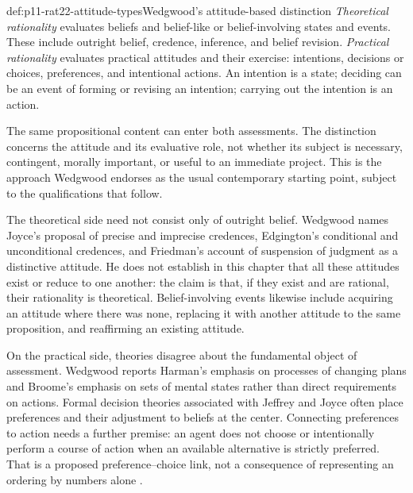 \begin{hbdefinition}{def:p11-rat22-attitude-types}{Wedgwood's attitude-based distinction}
\emph{Theoretical rationality} evaluates beliefs and belief-like or
belief-involving states and events. These include outright belief,
credence, inference, and belief revision.
\emph{Practical rationality} evaluates practical attitudes and their
exercise: intentions, decisions or choices, preferences, and intentional
actions. An intention is a state; deciding can be an event of forming or
revising an intention; carrying out the intention is an action.

The same propositional content can enter both assessments. The distinction
concerns the attitude and its evaluative role, not whether its subject is
necessary, contingent, morally important, or useful to an immediate project.
This is the approach Wedgwood endorses as the usual contemporary starting
point, subject to the qualifications that follow.
\end{hbdefinition}

The theoretical side need not consist only of outright belief. Wedgwood
names Joyce's proposal of precise and imprecise credences, Edgington's
conditional and unconditional credences, and Friedman's account of
suspension of judgment as a distinctive attitude. He does not establish
in this chapter that all these attitudes exist or reduce to one another:
the claim is that, if they exist and are rational, their rationality is
theoretical. Belief-involving events likewise include acquiring an attitude
where there was none, replacing it with another attitude to the same
proposition, and reaffirming an existing attitude.

On the practical side, theories disagree about the fundamental object of
assessment. Wedgwood reports Harman's emphasis on processes of changing
plans and Broome's emphasis on sets of mental states rather than direct
requirements on actions. Formal decision theories associated with Jeffrey
and Joyce often place preferences and their adjustment to beliefs at the
center. Connecting preferences to action needs a further premise: an agent
does not choose or intentionally perform a course of action when an
available alternative is strictly preferred. That is a proposed
preference--choice link, not a consequence of representing an ordering
by numbers alone
\parencite[pp.~138--139]{RalphWedgwood2021}.

